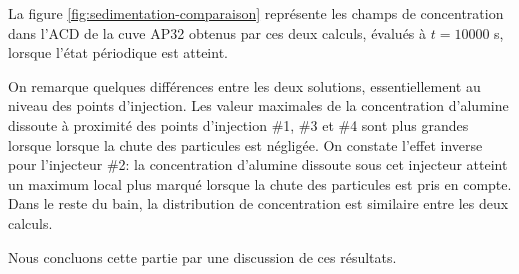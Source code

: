 La figure \ref{fig:sedimentation-comparaison} représente les champs de
concentration dans l'ACD de la cuve AP32 obtenus par ces deux calculs,
évalués à $t = \num{10000}$ \si{\second}, lorsque l'état périodique est
atteint.

On remarque quelques différences entre les deux solutions,
essentiellement au niveau des points d'injection. Les valeur maximales
de la concentration d'alumine dissoute à proximité des points
d'injection \#1, \#3 et \#4 sont plus grandes lorsque lorsque la chute
des particules est négligée. On constate l'effet inverse pour
l'injecteur \#2: la concentration d'alumine dissoute sous cet
injecteur atteint un maximum local plus marqué lorsque la chute des
particules est pris en compte. Dans le reste du bain, la distribution
de concentration est similaire entre les deux calculs.

Nous concluons cette partie par une discussion de ces résultats.
